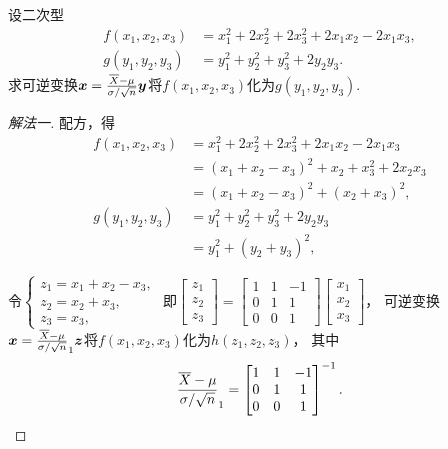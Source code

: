 \begin{example}
设二次型\begin{align*}
	f(x_1,x_2,x_3) &= x_1^2 + 2 x_2^2 + 2 x_3^2 + 2 x_1 x_2 - 2 x_1 x_3, \\
	g(y_1,y_2,y_3) &= y_1^2 + y_2^2 + y_3^2 + 2 y_2 y_3.
\end{align*}
求可逆变换\(\vb{x} = \P \vb{y}\)将\(f(x_1,x_2,x_3)\)化为\(g(y_1,y_2,y_3)\).
\begin{solution}\let\qed\relax
\begin{proof}[解法一]
配方，得\begin{align*}
	f(x_1,x_2,x_3) &= x_1^2 + 2 x_2^2 + 2 x_3^2 + 2 x_1 x_2 - 2 x_1 x_3 \\
	&= (x_1 + x_2 - x_3)^2 + x_2 + x_3^2 + 2 x_2 x_3 \\
	&= (x_1 + x_2 - x_3)^2 + (x_2 + x_3)^2, \\
	g(y_1,y_2,y_3) &= y_1^2 + y_2^2 + y_3^2 + 2 y_2 y_3 \\
	&= y_1^2 + (y_2 + y_3)^2,
\end{align*}

令\(\left\{ \begin{array}{l}
	z_1 = x_1 + x_2 - x_3, \\
	z_2 = x_2 + x_3, \\
	z_3 = x_3,
\end{array} \right.\)
即\(\begin{bmatrix}
	z_1 \\ z_2 \\ z_3
\end{bmatrix}
= \begin{bmatrix}
	1 & 1 & -1 \\
	0 & 1 & 1 \\
	0 & 0 & 1
\end{bmatrix}
\begin{bmatrix}
	x_1 \\ x_2 \\ x_3
\end{bmatrix}\)，
可逆变换\(\vb{x} = \P_1 \vb{z}\)将\(f(x_1,x_2,x_3)\)化为\(h(z_1,z_2,z_3)\)，
其中\begin{equation*}
	\P_1 = \begin{bmatrix}
		1 & 1 & -1 \\
		0 & 1 & 1 \\
		0 & 0 & 1
	\end{bmatrix}^{-1}.
\end{equation*}


\end{proof}
\end{solution}
\end{example}
